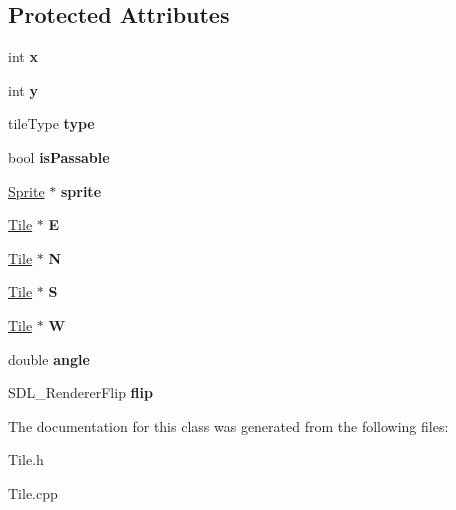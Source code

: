 \subsection*{Protected Attributes}
\begin{DoxyCompactItemize}
\item 
int {\bfseries x}\hypertarget{class_tile_a47b5eb2072d4b1978923a480043899c9}{}\label{class_tile_a47b5eb2072d4b1978923a480043899c9}

\item 
int {\bfseries y}\hypertarget{class_tile_a2d87d8813151af6bbd60811964f047a8}{}\label{class_tile_a2d87d8813151af6bbd60811964f047a8}

\item 
tile\+Type {\bfseries type}\hypertarget{class_tile_a5aa7ae6350675967edf46400c486a412}{}\label{class_tile_a5aa7ae6350675967edf46400c486a412}

\item 
bool {\bfseries is\+Passable}\hypertarget{class_tile_afa72b458d549b9533f058e2d2fad0f81}{}\label{class_tile_afa72b458d549b9533f058e2d2fad0f81}

\item 
\hyperlink{class_sprite}{Sprite} $\ast$ {\bfseries sprite}\hypertarget{class_tile_af768c5b838f49de5d626880c88b3d515}{}\label{class_tile_af768c5b838f49de5d626880c88b3d515}

\item 
\hyperlink{class_tile}{Tile} $\ast$ {\bfseries E}\hypertarget{class_tile_a0d63c88d4136aecedcb2756d20615b89}{}\label{class_tile_a0d63c88d4136aecedcb2756d20615b89}

\item 
\hyperlink{class_tile}{Tile} $\ast$ {\bfseries N}\hypertarget{class_tile_af1255bd2dba8dfa019fcd65a05805ed1}{}\label{class_tile_af1255bd2dba8dfa019fcd65a05805ed1}

\item 
\hyperlink{class_tile}{Tile} $\ast$ {\bfseries S}\hypertarget{class_tile_adc655f39bc82d9b5898b991faea9df42}{}\label{class_tile_adc655f39bc82d9b5898b991faea9df42}

\item 
\hyperlink{class_tile}{Tile} $\ast$ {\bfseries W}\hypertarget{class_tile_ae992c1605ed059cb9eaff737b99824dc}{}\label{class_tile_ae992c1605ed059cb9eaff737b99824dc}

\item 
double {\bfseries angle}\hypertarget{class_tile_a33219999fbd38d9c9e8e98d09a9b65a5}{}\label{class_tile_a33219999fbd38d9c9e8e98d09a9b65a5}

\item 
S\+D\+L\+\_\+\+Renderer\+Flip {\bfseries flip}\hypertarget{class_tile_a815af374aa83cd0be79bb5553056b15e}{}\label{class_tile_a815af374aa83cd0be79bb5553056b15e}

\end{DoxyCompactItemize}


The documentation for this class was generated from the following files\+:\begin{DoxyCompactItemize}
\item 
Tile.\+h\item 
Tile.\+cpp\end{DoxyCompactItemize}
